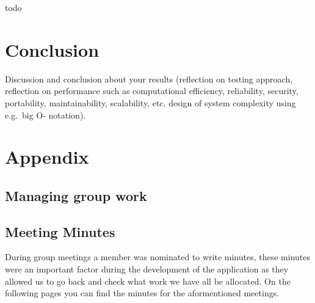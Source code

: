 \documentclass[
  english,
  a4paper,
,tablecaptionabove
]{scrartcl}
\begin{document}
todo

\newpage

\hypertarget{conclusion}{%
\section{Conclusion}\label{conclusion}}

Discussion and conclusion about your results (reflection on testing
approach, reflection on performance such as computational efficiency,
reliability, security, portability, maintainability, scalability, etc.
design of system complexity using e.g.~big O- notation).

\newpage

\hypertarget{appendix}{%
\section{Appendix}\label{appendix}}

\hypertarget{managing-group-work}{%
\subsection{Managing group work}\label{managing-group-work}}

\hypertarget{meeting-minutes}{%
\subsection{Meeting Minutes}\label{meeting-minutes}}

During group meetings a member was nominated to write minutes, these
minutes were an important factor during the development of the
application as they allowed us to go back and check what work we have
all be allocated. On the following pages you can find the minutes for
the aformentioned meetings.
\end{document}
